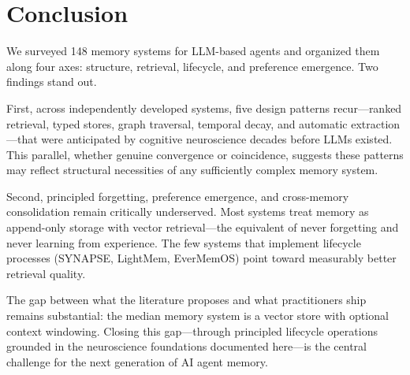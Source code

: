 \section{Conclusion}
\label{sec:conclusion}

We surveyed 148 memory systems for LLM-based agents and organized
them along four axes: structure, retrieval, lifecycle, and preference
emergence. Two findings stand out.

First, across independently developed systems, five design patterns
recur---ranked retrieval, typed stores, graph traversal, temporal
decay, and automatic extraction---that were anticipated by cognitive
neuroscience decades before LLMs existed. This parallel, whether
genuine convergence or coincidence, suggests these patterns may reflect
structural necessities of any sufficiently complex memory system.

Second, principled forgetting, preference emergence, and cross-memory
consolidation remain critically underserved. Most systems treat memory
as append-only storage with vector retrieval---the equivalent of
never forgetting and never learning from experience. The few systems
that implement lifecycle processes (SYNAPSE, LightMem, EverMemOS) point
toward measurably better retrieval quality.

The gap between what the literature proposes and what practitioners
ship remains substantial: the median memory system is a vector store
with optional context windowing. Closing this gap---through principled
lifecycle operations grounded in the neuroscience foundations
documented here---is the central challenge for the next generation of
AI agent memory.
